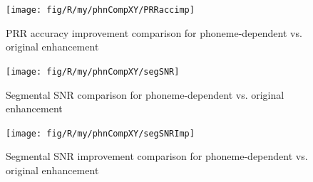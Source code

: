 \begin{figure}[h]
\noindent \begin{centering}
\texttt{[image: fig/R/my/phnCompXY/PRRaccimp]}
\par\end{centering}

\protect\caption{\label{fig:prraccimp-comparison-phn}\acs{PRR} accuracy improvement
comparison for phoneme-dependent vs. original enhancement}
\end{figure}


\begin{figure}[h]
\noindent \begin{centering}
\texttt{[image: fig/R/my/phnCompXY/segSNR]}
\par\end{centering}

\protect\caption{\label{fig:segsnr-comparison-phn}Segmental \acs{SNR} comparison
for phoneme-dependent vs. original enhancement}
\end{figure}


\begin{figure}[h]
\noindent \begin{centering}
\texttt{[image: fig/R/my/phnCompXY/segSNRImp]}
\par\end{centering}

\protect\caption{\label{fig:segsnrimp-comparison-phn}Segmental \acs{SNR} improvement
comparison for phoneme-dependent vs. original enhancement}
\end{figure}

